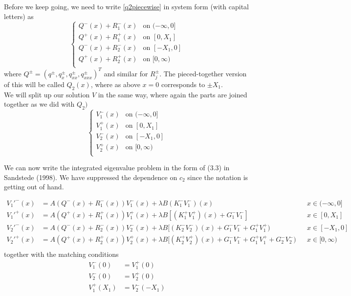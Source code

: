 \documentclass[12pt]{article}
\begin{document}
Before we keep going, we need to write \eqref{q2piecewise} in system form (with capital letters) as
\begin{equation}\label{q2piecewisesystem}
\begin{cases}
Q^-(x) + R_1^-(x) & \text{on } (-\infty, 0] \\
Q^+(x) + R_1^+(x) & \text{on } [0, X_1] \\
Q^-(x) + R_2^-(x) & \text{on } [-X_1, 0] \\
Q^+(x) + R_2^+(x) & \text{on } [0, \infty) \\ 
\end{cases}
\end{equation}
where $Q^\pm = (q^\pm, q^\pm_x, q^\pm_{xx}, q^\pm_{xxx})^T$ and similar for $R_j^\pm$. The pieced-together version of this will be called $Q_2(x)$, where as above $x = 0$ corresponds to $\pm X_1$.\\


We will split up our solution $V$ in the same way, where again the parts are joined together as we did with $Q_2)$
\begin{equation}
\begin{cases}
V_1^-(x) & \text{on } (-\infty, 0] \\
V_1^+(x) & \text{on } [0, X_1] \\
V_2^-(x) & \text{on } [-X_1, 0] \\
V_2^+(x) & \text{on } [0, \infty) \\ 
\end{cases}
\end{equation}

We can now write the integrated eigenvalue problem in the form of (3.3) in Sandstede (1998). We have suppressed the dependence on $c_2$ since the notation is getting out of hand.

\begin{align*}
V_1'^-(x) &= A(Q^-(x) + R_1^-(x))V_1^-(x) + \lambda B (K_1^- V_1^-)(x) && x \in (-\infty, 0] \\
V_1'^+(x) &= A(Q^+(x) + R_1^+(x))V_1^+(x) + \lambda B [(K_1^+ V_1^+)(x) + G_1^- V_1^-] && x \in [0, X_1] \\
V_2'^-(x) &= A(Q^-(x) + R_2^-(x))V_2^-(x) + \lambda B [(K_2^- V_2^-)(x) + G_1^- V_1^- + G_1^+ V_1^+) && x \in [-X_1, 0] \\
V_2'^+(x) &= A(Q^+(x) + R_2^+(x))V_2^+(x) + \lambda B [(K_2^+ V_2^+)(x) + G_1^- V_1^- + G_1^+ V_1^+ + G_2^- V_2^-) && x \in [0, \infty) \\ 
\end{align*}
together with the matching conditions
\begin{align*}
V_1^-(0) &= V_1^+(0) \\
V_2^-(0) &= V_2^+(0) \\
V_1^+(X_1) &= V_2^-(-X_1)
\end{align*}
\end{document}
